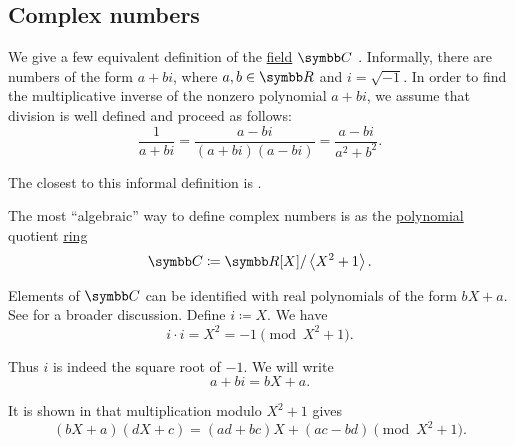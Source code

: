 \subsection{Complex numbers}\label{subsec:complex_numbers}

\begin{Definition}\label{def:complex_numbers}
  We give a few equivalent definition of the \hyperref[def:field]{field} \( \BC \) . Informally, there are numbers of the form \( a + bi \), where \( a, b \in \BR \) and \( i = \sqrt{-1} \). In order to find the multiplicative inverse of the nonzero polynomial \( a + bi \), we assume that division is well defined and proceed as follows:
  \begin{equation}\label{def:complex_numbers/inverse}
    \frac 1 {a + bi} = \frac {a - bi} {(a + bi)(a - bi)} = \frac{a - bi}{a^2 + b^2}.
  \end{equation}

  The closest to this informal definition is .

  \begin{DefEnum}
     The most \enquote{algebraic} way to define complex numbers is as the \hyperref[def:polynomial]{polynomial} quotient \hyperref[thm:polynomial_quotient_rings_equinumerous_with_module_of_polynomials]{ring}
    \begin{equation*}
      \BC \coloneqq \BR[X] / \Gen{X^2 + 1}.
    \end{equation*}

    Elements of \( \BC \) can be identified with real polynomials of the form \( bX + a \). See  for a broader discussion.
    Define \( i \coloneqq X \). We have
    \begin{equation*}
      i \cdot i = X^2 = -1 \pmod {X^2 + 1}.
    \end{equation*}

    Thus \( i \) is indeed the square root of \( -1 \). We will write
    \begin{equation*}
      a + bi = bX + a.
    \end{equation*}

    It is shown in  that multiplication modulo \( X^2 + 1 \) gives
    \begin{equation}\label{def:complex_numbers/polynomials/multiplication}
     (bX + a) (dX + c) = (ad + bc)X + (ac - bd) \pmod {X^2 + 1}.
    \end{equation}


\end{DefEnum}
\end{Definition}
